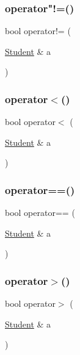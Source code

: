 \mbox{\label{classStudent_ab1f4cbc4e32a29b489b87b31366bb4e7}} 
\subsubsection{\texorpdfstring{operator"!=()}{operator!=()}}
{\footnotesize\ttfamily bool operator!= (\begin{DoxyParamCaption}\item[{\mbox{\hyperlink{classStudent}{Student}} \&}]{a }\end{DoxyParamCaption})}

\mbox{\label{classStudent_aac01d66b5c4cf429210264eb9d33c84e}} 
\subsubsection{\texorpdfstring{operator$<$()}{operator<()}}
{\footnotesize\ttfamily bool operator$<$ (\begin{DoxyParamCaption}\item[{\mbox{\hyperlink{classStudent}{Student}} \&}]{a }\end{DoxyParamCaption})}

\mbox{\label{classStudent_af3677abbb99886c6c422c63ed2967c19}} 
\subsubsection{\texorpdfstring{operator==()}{operator==()}}
{\footnotesize\ttfamily bool operator== (\begin{DoxyParamCaption}\item[{\mbox{\hyperlink{classStudent}{Student}} \&}]{a }\end{DoxyParamCaption})}

\mbox{\label{classStudent_aa0d55242e485d234a9df02cc1065bc94}} 
\subsubsection{\texorpdfstring{operator$>$()}{operator>()}}
{\footnotesize\ttfamily bool operator$>$ (\begin{DoxyParamCaption}\item[{\mbox{\hyperlink{classStudent}{Student}} \&}]{a }\end{DoxyParamCaption})}

